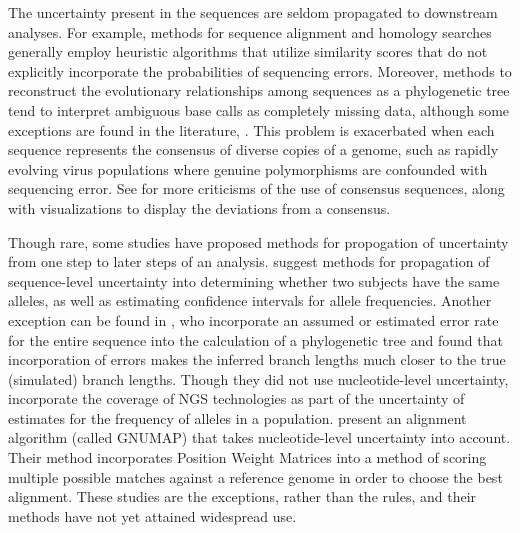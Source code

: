 \documentclass[10pt]{article}
\begin{document}
The uncertainty present in the sequences are seldom propagated to downstream analyses.
For example, methods for sequence alignment and homology searches generally employ heuristic algorithms that utilize similarity scores that do not explicitly incorporate the probabilities of sequencing errors.
Moreover, methods to reconstruct the evolutionary relationships among sequences as a phylogenetic tree tend to interpret ambiguous base calls as completely missing data, although some exceptions are found in the literature, \eg \citet{depristoFrameworkVariationDiscovery2011}.
This problem is exacerbated when each sequence represents the consensus of diverse copies of a genome, such as rapidly evolving virus populations where genuine polymorphisms are confounded with sequencing error. 
See \citet{schneiderConsensusSequenceZen2002} for more criticisms of the use of consensus sequences, along with visualizations \citep[called \emph{sequence logos}, ]{schneiderSequenceLogosNew1990} to display the deviations from a consensus.

Though rare, some studies have proposed methods for propogation of uncertainty from one step to later steps of an analysis.
\citet{oraweAccountingUncertaintyDNA2015} suggest methods for propagation of sequence-level uncertainty into determining whether two subjects have the same alleles, as well as estimating confidence intervals for allele frequencies. 
Another exception can be found in \citet{kuhnerCorrectingSequencingError2014}, who incorporate an assumed or estimated error rate for the entire sequence into the calculation of a phylogenetic tree and found that incorporation of errors makes the inferred branch lengths much closer to the true (simulated) branch lengths.
Though they did not use nucleotide-level uncertainty, \citet{gompertHierarchicalBayesianModel2011} incorporate the coverage of NGS technologies as part of the uncertainty of estimates for the frequency of alleles in a population.
\citet{clementGNUMAPAlgorithmUnbiased2010} present an alignment algorithm (called GNUMAP) that takes nucleotide-level uncertainty into account. 
Their method incorporates Position Weight Matrices into a method of scoring multiple possible matches against a reference genome in order to choose the best alignment. 
These studies are the exceptions, rather than the rules, and their methods have not yet attained widespread use.
\end{document}
